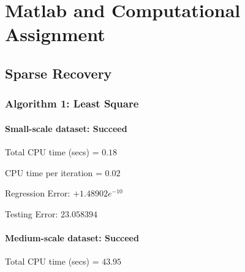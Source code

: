 \documentclass[11pt,a4paper]{report}
\begin{document}
\begin{titlepage}
    \maketitle
\end{titlepage}
\renewcommand{\contentsname}{Table of Contents}
\begin{center} 
    \tableofcontents 
\end{center}
\newpage

\chapter{Matlab and Computational Assignment}
\section{Sparse Recovery}
\subsection{Algorithm 1: Least Square}
\subsubsection{Small-scale dataset: Succeed}
\hspace{0.47cm}
    Total CPU time (secs)  = $0.18$  

    CPU time per iteration = $0.02$

    Regression Error: $+1.48902e^{-10}$
    
    Testing Error: $23.058394$

\subsubsection{Medium-scale dataset: Succeed}
\hspace{0.47cm}
    Total CPU time (secs)  = $43.95$  
\end{document}
